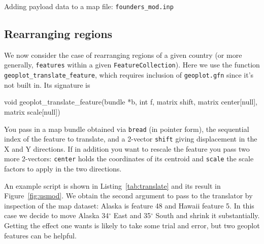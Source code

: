 \documentclass{article}
\begin{document}
\begin{script}[p]
  \caption{Adding payload data to a map file:
    \texttt{founders\_mod.inp}}
  \label{tab:add-gdp}
\end{script}

\subsection{Rearranging regions}
\label{sec:rearrange}

We now consider the case of rearranging regions of a given country (or
more generally, \texttt{features} within a given
\texttt{FeatureCollection}). Here we use the function
\texttt{geoplot\_translate\_feature}, which requires inclusion of
\texttt{geoplot.gfn} since it's not built in. Its signature is
\begin{code}
void geoplot_translate_feature(bundle *b, int f,
                               matrix shift,
                               matrix center[null],
                               matrix scale[null])
\end{code}
You pass in a map bundle obtained via \texttt{bread} (in pointer
form), the sequential index of the feature to translate, and a
2-vector \texttt{shift} giving displacement in the X and Y
directions. If in addition you want to rescale the feature you pass
two more 2-vectors: \texttt{center} holds the coordinates of its
centroid and \texttt{scale} the scale factors to apply in the two
directions.

An example script is shown in Listing~\ref{tab:translate} and its
result in Figure~\ref{fig:usmod}. We obtain the second argument to
pass to the translator by inspection of the map dataset: Alaska is
feature 48 and Hawaii feature 5. In this case we decide to move Alaska
34$^{\circ}$ East and 35$^{\circ}$ South and shrink it substantially.
Getting the effect one wants is likely to take some trial and error,
but two \textsf{geoplot} features can be helpful.
\end{document}
